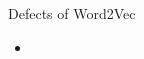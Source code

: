 \begin{frame}[fragile]{Defects of Word2Vec}

    \begin{itemize}
        \item
    \end{itemize}

\end{frame}